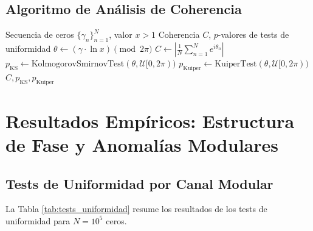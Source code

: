 \documentclass[12pt, a4paper]{article}
\theoremstyle{plain}
\theoremstyle{definition}
\theoremstyle{remark}
\begin{document}
\subsection{Algoritmo de Análisis de Coherencia}
\label{subsec:algoritmo_coherencia}

\begin{algorithm}[H]
\caption{Análisis de Coherencia de Fase y Tests de Uniformidad}
\label{alg:fases_coherencia}
\begin{algorithmic}[1]
\Require Secuencia de ceros $\{\gamma_n\}_{n=1}^N$, valor $x > 1$
\Ensure Coherencia $C$, $p$-valores de tests de uniformidad
    \State $\theta \gets (\gamma \cdot \ln x) \pmod{2\pi}$ 
    \State $C \gets \left|\frac{1}{N} \sum_{n=1}^N e^{i\theta_n}\right|$ 
    \State $p_{\text{KS}} \gets \text{KolmogorovSmirnovTest}(\theta, \mathcal{U}[0, 2\pi))$
    \State $p_{\text{Kuiper}} \gets \text{KuiperTest}(\theta, \mathcal{U}[0, 2\pi))$
    \State \Return $C, p_{\text{KS}}, p_{\text{Kuiper}}$
\EndFunction
\end{algorithmic}
\end{algorithm}

\section{Resultados Empíricos: Estructura de Fase y Anomalías Modulares}
\label{sec:resultados}

\subsection{Tests de Uniformidad por Canal Modular}
\label{subsec:tests_uniformidad}

La Tabla \ref{tab:tests_uniformidad} resume los resultados de los tests de uniformidad para $N=10^5$ ceros.
\end{document}
